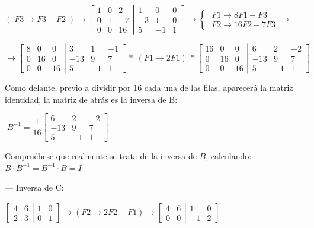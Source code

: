 \begin{ejem}
\noindent \small{$(\;F3\to F3-F2 \; )  \to 
\left[\begin{matrix} 1&0&2\\0&1&-7\\0&0&16  \end{matrix}\right|
\left. \begin{matrix} 1&0&0 \\ -3&1&0 \\5&-1&1  \end{matrix} \right] \to 
\begin{cases}\; F1\to 8F1-F3 \\ \; F2\to 16F2+7F3  \end{cases}\to  $}

\noindent \small{$  \to   
\left[\begin{matrix} 8&0&0\\0&16&0\\0&0&16  \end{matrix}\right|
\left. \begin{matrix} 3&1&-1 \\ -13&9&7 \\5&-1&1  \end{matrix} \right]
* \; (F1\to 2F1) \;  *  
\left[\begin{matrix} 16&0&0\\0&16&0\\0&0&16  \end{matrix}\right|
\left. \begin{matrix} 6&2&-2 \\ -13&9&7 \\5&-1&1  \end{matrix} \right]
$}  

\normalsize{Como delante, previo a dividir por $16$ cada una de las filas, aparecerá la matriz identidad, la matriz de atrás es la inversa de B}:

\hspace{15mm} $\; B^{-1}= \dfrac 1 {16} \left[ \begin{matrix} 6&2&-2 \\ -13&9&7 \\5&-1&1  \end{matrix} \right]\; $

Compruébese que realmente se trata de la inversa de $B$, calculando: $B\cdot B^{-1}=B^{-1}\cdot B=I$

--- Inversa de C:

$\left[\begin{matrix} 4&6\\2&3  \end{matrix}\right|
\left.\begin{matrix} 1&0\\0&1  \end{matrix}\right] \to (F2\to 2F2-F1) \to 
\left[\begin{matrix} 4&\boxed{6}\\0&0  \end{matrix}\right|
\left.\begin{matrix} 1&0\\-1&2  \end{matrix}\right]$


\end{ejem}
